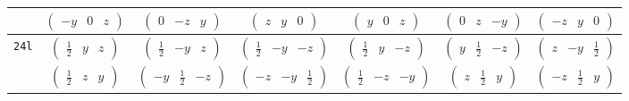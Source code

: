 \documentclass[fleqn,9pt,landscape]{jsarticle}
\begin{document}
\begin{center}
\begin{longtable}{ccccccc}
& $ \begin{pmatrix} - y & 0 & z \end{pmatrix} $ & $ \begin{pmatrix} 0 & - z & y \end{pmatrix} $ & $ \begin{pmatrix} z & y & 0 \end{pmatrix} $ & $ \begin{pmatrix} y & 0 & z \end{pmatrix} $ & $ \begin{pmatrix} 0 & z & - y \end{pmatrix} $ & $ \begin{pmatrix} - z & y & 0 \end{pmatrix} $ \\ \hline
{\tt 24l} & $ \begin{pmatrix} \frac{1}{2} & y & z \end{pmatrix} $ & $ \begin{pmatrix} \frac{1}{2} & - y & z \end{pmatrix} $ & $ \begin{pmatrix} \frac{1}{2} & - y & - z \end{pmatrix} $ & $ \begin{pmatrix} \frac{1}{2} & y & - z \end{pmatrix} $ & $ \begin{pmatrix} y & \frac{1}{2} & - z \end{pmatrix} $ & $ \begin{pmatrix} z & - y & \frac{1}{2} \end{pmatrix} $ \\
& $ \begin{pmatrix} \frac{1}{2} & z & y \end{pmatrix} $ & $ \begin{pmatrix} - y & \frac{1}{2} & - z \end{pmatrix} $ & $ \begin{pmatrix} - z & - y & \frac{1}{2} \end{pmatrix} $ & $ \begin{pmatrix} \frac{1}{2} & - z & - y \end{pmatrix} $ & $ \begin{pmatrix} z & \frac{1}{2} & y \end{pmatrix} $ & $ \begin{pmatrix} - z & \frac{1}{2} & y \end{pmatrix} $ \\

\end{longtable}
\end{center}
\end{document}
